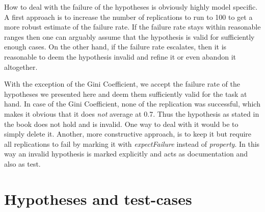 %
%		
%	
%
%
%

How to deal with the failure of the hypotheses is obviously highly model specific. A first approach is to increase the number of replications to run to 100 to get a more robust estimate of the failure rate. If the failure rate stays within reasonable ranges then one can arguably assume that the hypothesis is valid for sufficiently enough cases. On the other hand, if the failure rate escalates, then it is reasonable to deem the hypothesis invalid and refine it or even abandon it altogether.

With the exception of the Gini Coefficient, we accept the failure rate of the hypotheses we presented here and deem them sufficiently valid for the task at hand. In case of the Gini Coefficient, none of the replication was successful, which makes it obvious that it does \textit{not} average at 0.7. Thus the hypothesis as stated in the book does not hold and is invalid. One way to deal with it would be to simply delete it. Another, more constructive approach, is to keep it but require all replications to fail by marking it with \textit{expectFailure} instead of \textit{property}. In this way an invalid hypothesis is marked explicitly and acts as documentation and also as test.

\section{Hypotheses and test-cases}
\label{sec:hypotheses_testcases}

